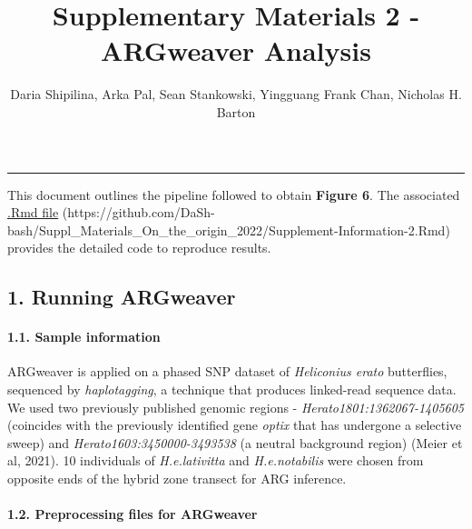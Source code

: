 \documentclass[
]{article}
\title{Supplementary Materials 2 - ARGweaver Analysis}
\author{Daria Shipilina, Arka Pal, Sean Stankowski, Yingguang Frank Chan, Nicholas H. Barton}
\date{}
\begin{document}
\maketitle

\begin{center}\rule{0.5\linewidth}{0.5pt}\end{center}

\hfill\break
\setcounter{table}{0} \renewcommand{\thetable}{S\arabic{table}} \setcounter{figure}{0} \renewcommand{\thefigure}{S\arabic{figure}}

This document outlines the pipeline followed to obtain
\textbf{Figure 6}. The associated
\href{https://github.com/DaSh-bash/Suppl_Materials_On_the_origin_2022}{.Rmd
file} (https://github.com/DaSh-bash/Suppl\_Materials\_On\_the\_origin\_2022/Supplement-Information-2.Rmd) provides the detailed code to reproduce results.

\hypertarget{running-argweaver}{%
\subsection{1. Running ARGweaver}\label{running-argweaver}}

\hypertarget{sample-information}{%
\paragraph{\texorpdfstring{1.1. Sample information\\
}{1.1. Sample information }}\label{sample-information}}

\hfill\break
ARGweaver is applied on a phased SNP dataset of \emph{Heliconius
erato} butterflies, sequenced by \emph{haplotagging}, a technique that
produces linked-read sequence data. We used two previously
published genomic regions - \emph{Herato1801:1362067-1405605} (coincides
with the previously identified gene \emph{optix} that has undergone a
selective sweep) and \emph{Herato1603:3450000-3493538} (a neutral
background region) (Meier et al, 2021). 10 individuals of
\emph{H.e.lativitta} and \emph{H.e.notabilis} were chosen from opposite
ends of the hybrid zone transect for ARG inference.

\hypertarget{preprocessing-files-for-argweaver}{%
\paragraph{\texorpdfstring{1.2. Preprocessing files for ARGweaver\\
}{1.2. Preprocessing files for ARGweaver }}\label{preprocessing-files-for-argweaver}}
\end{document}
